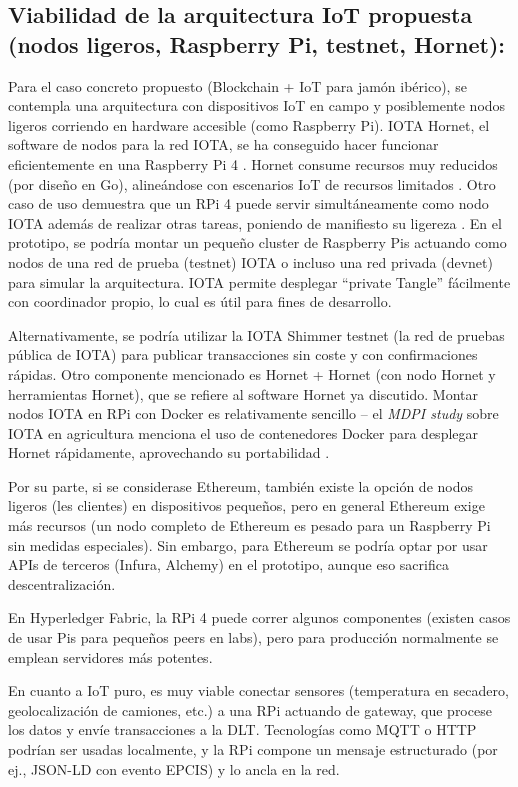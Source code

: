 \subsection{Viabilidad de la arquitectura IoT propuesta (nodos ligeros, Raspberry Pi, testnet, Hornet):}
Para el caso concreto propuesto (Blockchain + IoT para jamón ibérico), se contempla una arquitectura con dispositivos IoT en campo y posiblemente nodos ligeros corriendo en hardware accesible (como Raspberry Pi). IOTA Hornet, el software de nodos para la red IOTA, se ha conseguido hacer funcionar eficientemente en una Raspberry Pi 4 \cite{noauthor_iotaledgerhornet_nodate}. Hornet consume recursos muy reducidos (por diseño en Go), alineándose con escenarios IoT de recursos limitados \cite{pullo_integrating_2024}. Otro caso de uso demuestra que un RPi 4 puede servir simultáneamente como nodo IOTA además de realizar otras tareas, poniendo de manifiesto su ligereza \cite{noauthor_iotaledgerhornet_nodate}. En el prototipo, se podría montar un pequeño cluster de Raspberry Pis actuando como nodos de una red de prueba (testnet) IOTA o incluso una red privada (devnet) para simular la arquitectura. IOTA permite desplegar “private Tangle” fácilmente con coordinador propio, lo cual es útil para fines de desarrollo.

Alternativamente, se podría utilizar la IOTA Shimmer testnet (la red de pruebas pública de IOTA) para publicar transacciones sin coste y con confirmaciones rápidas. Otro componente mencionado es Hornet + Hornet (con nodo Hornet y herramientas Hornet), que se refiere al software Hornet ya discutido. Montar nodos IOTA en RPi con Docker es relativamente sencillo – el \textit{MDPI study} sobre IOTA en agricultura menciona el uso de contenedores Docker para desplegar Hornet rápidamente, aprovechando su portabilidad \cite{pullo_integrating_2024}.

Por su parte, si se considerase Ethereum, también existe la opción de nodos ligeros (les clientes) en dispositivos pequeños, pero en general Ethereum exige más recursos (un nodo completo de Ethereum es pesado para un Raspberry Pi sin medidas especiales). Sin embargo, para Ethereum se podría optar por usar APIs de terceros (Infura, Alchemy) en el prototipo, aunque eso sacrifica descentralización.

En Hyperledger Fabric, la RPi 4 puede correr algunos componentes (existen casos de usar Pis para pequeños peers en labs), pero para producción normalmente se emplean servidores más potentes.

En cuanto a IoT puro, es muy viable conectar sensores (temperatura en secadero, geolocalización de camiones, etc.) a una RPi actuando de gateway, que procese los datos y envíe transacciones a la DLT. Tecnologías como MQTT o HTTP podrían ser usadas localmente, y la RPi compone un mensaje estructurado (por ej., JSON-LD con evento EPCIS) y lo ancla en la red.

